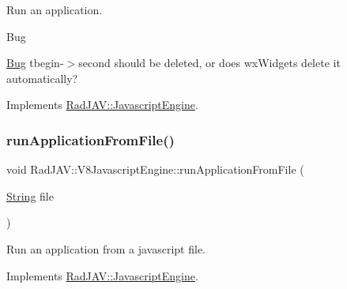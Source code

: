Run an application. 

\begin{DoxyRefDesc}{Bug}
\item[\mbox{\hyperlink{bug__bug000001}{Bug}}]tbegin-\/$>$second should be deleted, or does wx\+Widgets delete it automatically? \end{DoxyRefDesc}


Implements \mbox{\hyperlink{class_rad_j_a_v_1_1_javascript_engine_a11cc903f042db2b770183667ee36c6bf}{Rad\+J\+A\+V\+::\+Javascript\+Engine}}.

\mbox{\label{class_rad_j_a_v_1_1_v8_javascript_engine_aa0d9d2f20abcf434f8986f7417ebcc3e}} 
\subsubsection{\texorpdfstring{run\+Application\+From\+File()}{runApplicationFromFile()}}
{\footnotesize\ttfamily void Rad\+J\+A\+V\+::\+V8\+Javascript\+Engine\+::run\+Application\+From\+File (\begin{DoxyParamCaption}\item[{\mbox{\hyperlink{class_rad_j_a_v_1_1_string}{String}}}]{file }\end{DoxyParamCaption})\hspace{0.3cm}{\ttfamily [virtual]}}



Run an application from a javascript file. 



Implements \mbox{\hyperlink{class_rad_j_a_v_1_1_javascript_engine_a0a435f458e118a813c95ccb359d546e9}{Rad\+J\+A\+V\+::\+Javascript\+Engine}}.

\mbox{\label{class_rad_j_a_v_1_1_v8_javascript_engine_a724d0548650a735ceac32239f8442a20}} 
